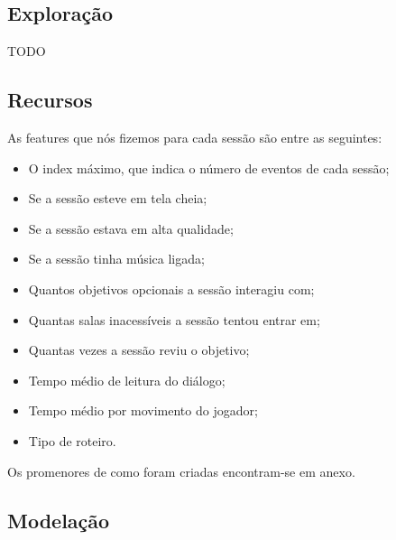 \documentclass[justified, 11pt]{scrartcl}
\begin{document}
  \subsection{Exploração}
  TODO

  \subsection{Recursos}
  As features que nós fizemos para cada sessão são entre as seguintes:
  \begin{itemize}
    \item O index máximo, que indica o número de eventos de cada sessão;
    \item Se a sessão esteve em tela cheia;
    \item Se a sessão estava em alta qualidade;
    \item Se a sessão tinha música ligada;
    \item Quantos objetivos opcionais a sessão interagiu com;
    \item Quantas salas inacessíveis a sessão tentou entrar em;
    \item Quantas vezes a sessão reviu o objetivo;
    \item Tempo médio de leitura do diálogo;
    \item Tempo médio por movimento do jogador;
    \item Tipo de roteiro.
  \end{itemize}

  Os promenores de como foram criadas encontram-se em anexo.

  \subsection{Modelação}

  
\end{document}
